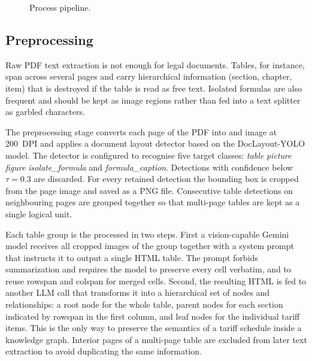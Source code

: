 \documentclass[conference]{IEEEtran}
\begin{document}
\begin{figure}[h]
\centering
{}
\caption{Process pipeline.}
\label{fig:process}
\end{figure}

\subsection{Preprocessing}

Raw PDF text extraction is not enough for legal documents. Tables, for instance, span across several pages and carry hierarchical information (section, chapter, item) that is destroyed if the table is read as free text. Isolated formulas are also frequent and should be kept as image regions rather than fed into a text splitter as garbled characters.

The preprocessing stage converts each page of the PDF into and image at 200~DPI and applies a document layout detector based on the DocLayout-YOLO model. The detector is configured to recognise five target classes: \textit{table} \textit{picture} \textit{figure} \textit{isolate\_formula} and \textit{formula\_caption}. Detections with confidence below $\tau=0.3$ are discarded. For every retained detection the bounding box is cropped from the page image and saved as a PNG file. Consecutive table detections on neighbouring pages are grouped together so that multi-page tables are kept as a single logical unit.

Each table group is the processed in two steps. First a vision-capable Gemini model receives all cropped images of the group together with a system prompt that instructs it to output a single HTML table. The prompt forbids summarization and requires the model to preserve every cell verbatim, and to reuse rowspan and colspan for merged cells. Second, the resulting HTML is fed to another LLM call that transforms it into a hierarchical set of nodes and relationships: a root node for the whole table, parent nodes for each section indicated by rowspan in the first column, and leaf nodes for the individual tariff items. This is the only way to preserve the semantics of a tariff schedule inside a knowledge graph. Interior pages of a multi-page table are excluded from later text extraction to avoid duplicating the same information.
\end{document}
